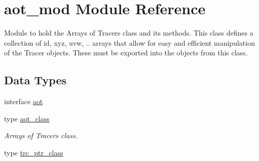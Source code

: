 \hypertarget{namespaceaot__mod}{}\section{aot\+\_\+mod Module Reference}
\label{namespaceaot__mod}


Module to hold the Arrays of Tracers class and its methods. This class defines a collection of id, xyz, uvw, .. arrays that allow for easy and efficient manipulation of the Tracer objects. These must be exported into the objects from this class.  


\subsection*{Data Types}
\begin{DoxyCompactItemize}
\item 
interface \mbox{\hyperlink{interfaceaot__mod_1_1aot}{aot}}
\item 
type \mbox{\hyperlink{structaot__mod_1_1aot__class}{aot\+\_\+class}}
\begin{DoxyCompactList}\small\item\em Arrays of Tracers class. \end{DoxyCompactList}\item 
type \mbox{\hyperlink{structaot__mod_1_1trc__ptr__class}{trc\+\_\+ptr\+\_\+class}}
\end{DoxyCompactItemize}
